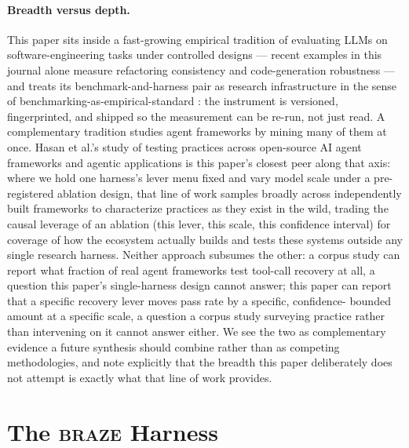 \documentclass[smallcondensed,natbib]{svjour3}
\newcommand{\braze}{\textsc{braze}}
\begin{document}
\paragraph{Breadth versus depth.} This paper sits inside a fast-growing
empirical tradition of evaluating LLMs on software-engineering tasks
under controlled designs --- recent examples in this journal alone
measure refactoring consistency \citep{zhang2026refactoring} and
code-generation robustness \citep{liu2026robustness} --- and treats
its benchmark-and-harness pair as research infrastructure in the sense
of benchmarking-as-empirical-standard
\citep{hasselbring2021benchmarking}: the instrument is versioned,
fingerprinted, and shipped so the measurement can be re-run, not just
read. A complementary tradition
studies agent frameworks by mining many of them at once. Hasan et al.'s
study of testing practices across open-source AI agent frameworks and
agentic applications \citep{hasan2026testing} is this paper's closest
peer along that axis: where we hold one harness's lever menu fixed and
vary model scale under a pre-registered ablation design, that line of
work samples broadly across independently built frameworks to
characterize practices as they exist in the wild, trading the causal
leverage of an ablation (this lever, this scale, this confidence
interval) for coverage of how the ecosystem actually builds and tests
these systems outside any single research harness. Neither approach
subsumes the other: a corpus study can report what fraction of real
agent frameworks test tool-call recovery at all, a question this
paper's single-harness design cannot answer; this paper can report
that a specific recovery lever moves pass rate by a specific, confidence-
bounded amount at a specific scale, a question a corpus study surveying
practice rather than intervening on it cannot answer either. We see the
two as complementary evidence a future synthesis should combine rather
than as competing methodologies, and note explicitly that the breadth
this paper deliberately does not attempt is exactly what that line of
work provides.

\section{The \braze{} Harness}\label{sec:harness}
\end{document}
